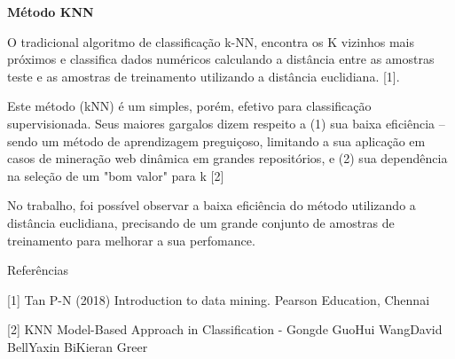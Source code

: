 \documentclass{article}
\date{\today}
\begin{document}
\textbf{Método KNN}
\vspace{2.0cm}


 O tradicional algoritmo de classificação k-NN, encontra os K vizinhos mais próximos e classifica dados numéricos calculando a distância entre as amostras teste e as amostras de treinamento utilizando a distância euclidiana. [1].
 
 \vspace{1.0cm}

Este método (kNN) é um simples, porém, efetivo para classificação supervisionada. Seus maiores gargalos  dizem respeito a (1) sua baixa eficiência – sendo um método de aprendizagem preguiçoso, limitando a sua aplicação em casos de mineração web dinâmica em grandes repositórios, e (2) sua dependência na seleção de um "bom valor" para k [2]

\vspace{1.0cm}

No trabalho, foi possível observar a baixa eficiência do método utilizando a distância euclidiana, precisando de um grande conjunto de amostras de treinamento para melhorar a sua perfomance.

\vspace{1.0cm}

Referências

\vspace{1.0cm}

[1] Tan P-N (2018) Introduction to data mining. Pearson Education, Chennai

\vspace{1.0cm}
[2] KNN Model-Based Approach in Classification - Gongde GuoHui WangDavid BellYaxin BiKieran Greer
\end{document}
